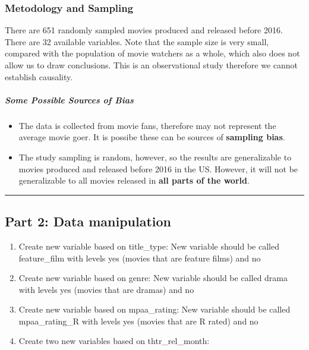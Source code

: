 \documentclass[]{article}
\providecommand{\tightlist}{%
  \setlength{\itemsep}{0pt}\setlength{\parskip}{0pt}}
\let\oldsubparagraph\subparagraph
\renewcommand{\subparagraph}[1]{\oldsubparagraph{#1}\mbox{}}
\begin{document}
\subsubsection{Metodology and Sampling}\label{metodology-and-sampling}

There are 651 randomly sampled movies produced and released before 2016.
There are 32 available variables. Note that the sample size is very
small, compared with the population of movie watchers as a whole, which
also does not allow us to draw conclusions. This is an observational
study therefore we cannot establish causality.

\subparagraph{Some Possible Sources of
Bias}\label{some-possible-sources-of-bias}

\begin{itemize}
\tightlist
\item
  The data is collected from movie fans, therefore may not represent the
  average movie goer. It is possibe these can be sources of
  \textbf{sampling bias}.
\item
  The study sampling is random, however, so the results are
  generalizable to movies produced and released before 2016 in the US.
  However, it will not be generalizable to all movies released in
  \textbf{all parts of the world}.
\end{itemize}

\begin{center}\rule{0.5\linewidth}{\linethickness}\end{center}

\subsection{Part 2: Data manipulation}\label{part-2-data-manipulation}

\begin{enumerate}
\def\labelenumi{\arabic{enumi})}
\item
  Create new variable based on title\_type: New variable should be
  called feature\_film with levels yes (movies that are feature films)
  and no
\item
  Create new variable based on genre: New variable should be called
  drama with levels yes (movies that are dramas) and no
\item
  Create new variable based on mpaa\_rating: New variable should be
  called mpaa\_rating\_R with levels yes (movies that are R rated) and
  no
\item
  Create two new variables based on thtr\_rel\_month:
\end{enumerate}
\end{document}
